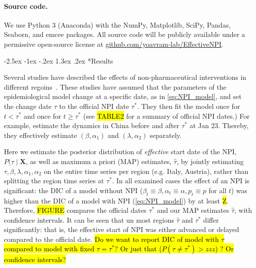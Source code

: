 \documentclass[12pt]{extarticle}
\makeatletter
\renewcommand\section{\@startsection {section}{1}{\z@}%
     {-2.5ex \@plus -1ex \@minus -.2ex}%
     {1.3ex \@plus.2ex}%
    {\Large\bfseries}}
\let\vec\mathbf
\makeatother
\begin{document}
\paragraph*{Source code.} 
We use Python 3 (Anaconda) with the NumPy, Matplotlib, SciPy, Pandas, Seaborn, and emcee packages.
All source code will be publicly available under a permissive open-source license at \href{http://github.com/yoavram-lab/EffectiveNPI}{github.com/yoavram-lab/EffectiveNPI}.



\section*{Results}

Several studies have described the effects of non-pharmaceutical interventions in different regoins~\citep{Flaxman2020,Gatto2020,Li2020}. 
These studies have assumed that the parameters of the epidemiological model change at a specific date, as in \autoref{eq:NPI_model}, and set the change date $\tau$ to the official NPI date $\tau^*$. They then fit the model once for $t<\tau^*$ and once for $t \ge \tau^*$ (see \hl{TABLE2} for a summary of official NPI dates.)
For example, \citet{Li2020} estimate the dynamics in China before and after $\tau^*$ at Jan 23. Thereby, they effectively estimate $(\beta, \alpha_1)$ and $(\lambda, \alpha_2)$ separately.

Here we estimate the posterior distribution of \emph{effective} start date of the NPI, $P(\tau \mid \vec{X}$, as well as maximum a priori (MAP) estimates, $\hat{\tau}$, by jointly estimating $\tau, \beta, \lambda, \alpha_1, \alpha_2$ on the entire time series per region (e.g. Italy, Austria), rather than splitting the region time series at $\tau^*$. 
In all examined cases the effect of an NPI is significant: the DIC of a model without NPI ($\beta_t \equiv \beta, \alpha_t \equiv \alpha, p_t \equiv p$ for all $t$) was higher than the DIC of a model with NPI (\autoref{eq:NPI_model}) by at least \hl{Z}.
Therefore, \hl{FIGURE} compares the official dates $\tau^*$ and our MAP estimates $\hat{\tau}$, with confidence intervals. 
It can be seen that un most regions $\hat{\tau}$ and $\tau^*$ differ significantly: that is, the effective start of NPI was either advanced or delayed compared to the official date.
\hl{Do we want to report DIC of model with $\tau$ compared to model with fixed $\tau=\tau^*$? Or just that  ($P(\tau \neq \tau^*) > zzz$) ? Or confidence intervals?}
\end{document}
